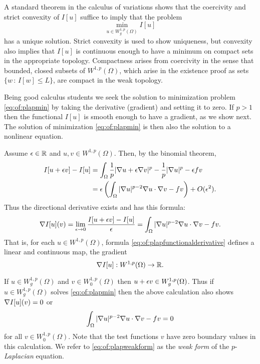 A standard theorem in the calculus of variations \citep[Theorem 8.2.2]{Evans2010} shows that the coercivity and strict convexity of $I[u]$ suffice to imply that the problem
\begin{equation}
\min_{u \in W_g^{1,p}(\Omega)} I[u] \label{eq:of:plapmin}
\end{equation}
has a unique solution.  Strict convexity is used to show uniqueness, but convexity also implies that $I[u]$ is continuous enough to have a minimum on compact sets in the appropriate topology.  Compactness arises from coercivity in the sense that bounded, closed subsets of $W^{1,p}(\Omega)$, which arise in the existence proof as sets $\{w\,:\,I[w] \le L\}$, are compact in the weak topology.

Being good calculus students we seek the solution to minimization problem \eqref{eq:of:plapmin} by taking the derivative (gradient) and setting it to zero.  If $p>1$ then the functional $I[u]$ is smooth enough to have a gradient, as we show next.  The solution of minimization \eqref{eq:of:plapmin} is then also the solution to a nonlinear equation.

Assume $\epsilon\in \mathbb{R}$ and $u,v \in W^{1,p}(\Omega)$.  Then, by the binomial theorem,
\begin{align*}
I[u+\epsilon v] - I[u] &= \int_\Omega \frac{1}{p} |\nabla u + \epsilon \nabla v|^p - \frac{1}{p} |\nabla u|^p - \epsilon f v \\
   &= \epsilon \left(\int_\Omega |\nabla u|^{p-2} \nabla u \cdot \nabla v - f v\right) + O(\epsilon^2).
\end{align*}
Thus the directional derivative exists and has this formula:
\begin{equation}
\nabla I[u](v) = \lim_{\epsilon\to 0} \frac{I[u+\epsilon v] - I[u]}{\epsilon} = \int_\Omega |\nabla u|^{p-2} \nabla u \cdot \nabla v - f v. \label{eq:of:plapfunctionalderivative}
\end{equation}
That is, for each $u \in W^{1,p}(\Omega)$, formula \eqref{eq:of:plapfunctionalderivative} defines a linear and continuous map, the gradient
   $$\nabla I[u] : W^{1,p}(\Omega) \to \mathbb{R}.$$

If $u \in W_g^{1,p}(\Omega)$ and $v\in W_0^{1,p}(\Omega)$ then $u+\epsilon v\in W_g^{1,p}(\Omega)$.  Thus if $u \in W_g^{1,p}(\Omega)$ solves \eqref{eq:of:plapmin} then the above calculation also shows $\nabla I[u](v)=0$ or
\begin{equation}
\int_\Omega |\nabla u|^{p-2} \nabla u \cdot \nabla v - f v = 0 \label{eq:of:plapweakform}
\end{equation}
for all $v\in W_0^{1,p}(\Omega)$.  Note that the test functions $v$ have zero boundary values in this calculation.  We refer to \eqref{eq:of:plapweakform} as the \emph{weak form} of the $p$-\emph{Laplacian} equation.

